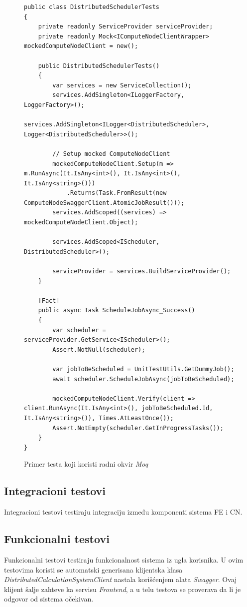 \documentclass[12pt,oneside]{memoir}
\begin{document}
\begin{figure}[h!]
\centering
\begin{lstlisting}
public class DistributedSchedulerTests
{
	private readonly ServiceProvider serviceProvider;
	private readonly Mock<IComputeNodeClientWrapper> mockedComputeNodeClient = new();

	public DistributedSchedulerTests()
	{
		var services = new ServiceCollection();
		services.AddSingleton<ILoggerFactory, LoggerFactory>();
		services.AddSingleton<ILogger<DistributedScheduler>, Logger<DistributedScheduler>>();

		// Setup mocked ComputeNodeClient
		mockedComputeNodeClient.Setup(m => m.RunAsync(It.IsAny<int>(), It.IsAny<int>(), It.IsAny<string>()))
			.Returns(Task.FromResult(new ComputeNodeSwaggerClient.AtomicJobResult()));
		services.AddScoped((services) => mockedComputeNodeClient.Object);

		services.AddScoped<IScheduler, DistributedScheduler>();

		serviceProvider = services.BuildServiceProvider();
	}

	[Fact]
	public async Task ScheduleJobAsync_Success()
	{
		var scheduler = serviceProvider.GetService<IScheduler>();
		Assert.NotNull(scheduler);

		var jobToBeScheduled = UnitTestUtils.GetDummyJob();
		await scheduler.ScheduleJobAsync(jobToBeScheduled);

		mockedComputeNodeClient.Verify(client => client.RunAsync(It.IsAny<int>(), jobToBeScheduled.Id, It.IsAny<string>()), Times.AtLeastOnce());
		Assert.NotEmpty(scheduler.GetInProgressTasks());
	}
}
\end{lstlisting}
\caption{Primer testa koji koristi radni okvir \emph{Moq}}
\label{fig:testscheduler}
\end{figure}

\subsection{Integracioni testovi}
Integracioni testovi testiraju integraciju između komponenti sistema FE i CN.

\subsection{Funkcionalni testovi}
Funkcionalni testovi testiraju funkcionalnost sistema iz ugla korisnika. U ovim testovima koristi se automatski generisana klijentska klasa \emph{DistributedCalculationSystemClient} nastala korišćenjem alata \emph{Swagger}. Ovaj klijent šalje zahteve ka servisu \emph{Frontend}, a u telu testova se proverava da li je odgovor od sistema očekivan.
\end{document}
